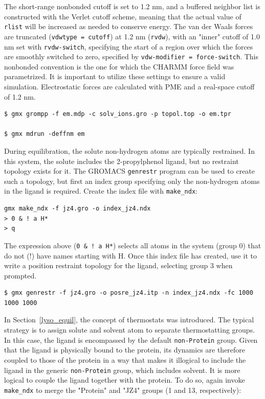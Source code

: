 \documentclass[9pt,tutorial,pubversion]{livecoms}
\begin{document}
The short-range nonbonded cutoff is set to 1.2 nm, and a buffered neighbor list is constructed with the Verlet cutoff scheme, meaning that the actual value of \texttt{rlist} will be increased as needed to conserve energy. The van der Waals forces are truncated (\texttt{vdwtype = cutoff}) at 1.2 nm (\texttt{rvdw}), with an "inner" cutoff of 1.0 nm set with \texttt{rvdw-switch}, specifying the start of a region over which the forces are smoothly switched to zero, specified by \texttt{vdw-modifier = force-switch}. This nonbonded convention is the one for which the CHARMM force field was parametrized. It is important to utilize these settings to ensure a valid simulation. Electrostatic forces are calculated with PME and a real-space cutoff of 1.2 nm.

\begin{lstlisting}
$ gmx grompp -f em.mdp -c solv_ions.gro -p topol.top -o em.tpr

$ gmx mdrun -deffnm em
\end{lstlisting}

During equilibration, the solute non-hydrogen atoms are typically restrained. In this system, the solute includes the 2-propylphenol ligand, but no restraint topology exists for it. The GROMACS \texttt{genrestr} program can be used to create such a topology, but first an index group specifying only the non-hydrogen atoms in the ligand is required. Create the index file with \texttt{make\_ndx}:

\begin{lstlisting}
gmx make_ndx -f jz4.gro -o index_jz4.ndx
> 0 & ! a H*
> q
\end{lstlisting}

The expression above (\texttt{0 \& ! a H*}) selects all atoms in the system (group 0) that do not (!) have names starting with H. Once this index file has created, use it to write a position restraint topology for the ligand, selecting group 3 when prompted.

\begin{lstlisting}
$ gmx genrestr -f jz4.gro -o posre_jz4.itp -n index_jz4.ndx -fc 1000 1000 1000
\end{lstlisting}

In Section~\ref{lyso_equil}, the concept of thermostats was introduced. The typical strategy is to assign solute and solvent atom to separate thermostatting groups. In this case, the ligand is encompassed by the default \texttt{non-Protein} group. Given that the ligand is physically bound to the protein, its dynamics are therefore coupled to those of the protein in a way that makes it illogical to include the ligand in the generic \texttt{non-Protein} group, which includes solvent. It is more logical to couple the ligand together with the protein. To do so, again invoke \texttt{make\_ndx} to merge the "Protein" and "JZ4" groups (1 and 13, respectively):
\end{document}
